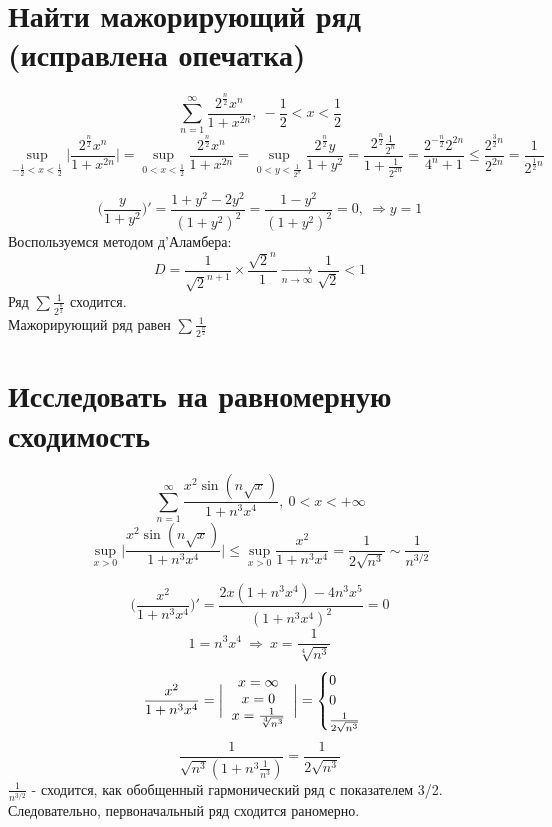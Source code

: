 \documentclass{article}
\begin{document}
\section{Найти мажорирующий ряд (исправлена опечатка)}
\[
    \sum\limits_{n=1}^\infty\frac{2^{\frac{n}{2}}x^n}{1 + x^{2n}}, \ -\frac{1}{2} < x < \frac{1}{2}
\]
\[
    \sup\limits_{-\frac{1}{2} < x < \frac{1}{2}} \bigg| \frac{2^{\frac{n}{2}}x^n}{1 + x^{2n}} \bigg| = \sup\limits_{0 < x < \frac{1}{2}} \frac{2^{\frac{n}{2}}x^n}{1 + x^{2n}} = \sup\limits_{0 < y < \frac{1}{2^n}} \frac{2^\frac{n}{2}y}{1+y^2} = \frac{2^\frac{n}{2}\frac{1}{2^n}}{1+\frac{1}{2^{2n}}} =
    \frac{2^{-\frac{n}{2}}2^{2n}}{4^n + 1} \le \frac{2^{\frac{3}{2}n}}{2^{2n}} = \frac{1}{2^{\frac{1}{2}n}}
\]

\[
    \biggl(
        \frac{y}{1+y^2}
    \biggr)' = \frac{1 + y^2 - 2y^2}{(1+y^2)^2} = \frac{1-y^2}{(1+y^2)^2} = 0, \ \Rightarrow y = 1
\]
Воспользуемся методом д'Аламбера:\\
\[
    D = \frac{1}{\sqrt{2}^{n+1}}\times\frac{\sqrt{2}^n}{1}\underset{n \rightarrow \infty}{\rightarrow} \frac{1}{\sqrt{2}} < 1
\]
Ряд $\sum\frac{1}{2^{\frac{n}{2}}}$ сходится. \\
Мажорирующий ряд равен $\sum\frac{1}{2^{\frac{n}{2}}}$




\section{Исследовать на равномерную сходимость}
\[
    \sum\limits_{n=1}^{\infty} \frac{x^2 \sin (n\sqrt{x})}{1 + n^3x^4}, \ 0 < x < +\infty
\]
\[
    \sup\limits_{x>0} \bigg| \frac{x^2 \sin (n\sqrt{x})}{1 + n^3x^4} \bigg| \le \sup\limits_{x>0} \frac{x^2}{1+n^3x^4} = \frac{1}{2\sqrt{n^3}} \sim \frac{1}{n^{3/2}} 
\]

\[
    \bigg( \frac{x^2}{1+ n^3x^4} \bigg)' = \frac{2x(1+n^3x^4) - 4n^3x^5}{(1+n^3x^4)^2} = 0
\]
\[
    1 =n^3x^4 \  \Rightarrow \   x = \frac{1}{\sqrt[4]{n^3}}
\] 
\[
    \frac{x^2}{1+n^3x^4} = \bigg| \begin{tabular}{ c }
        $x=\infty$  \\ 
        $x=0$  \\  
        $x=\frac{1}{\sqrt[4]{n^3}}$     
       \end{tabular} \bigg| = \begin{cases}
        0 \\
        0 \\
        \frac{1}{2\sqrt{n^3}}
       \end{cases}
\]
\[
       \frac{1}{\sqrt{n^3}(1+n^3\frac{1}{n^3})}=\frac{1}{2\sqrt{n^3}}
\]
$\frac{1}{n^{3/2}}$ - сходится, как обобщенный гармонический ряд с показателем 3/2. Следовательно, первоначальный ряд сходится раномерно.
\end{document}
